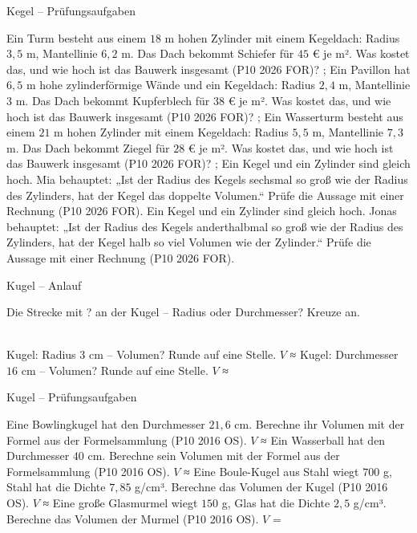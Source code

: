\begin{aufgabe}{Kegel – Prüfungsaufgaben}
\begin{teile}
\teil Ein Turm besteht aus einem $18$ m hohen Zylinder mit einem Kegeldach: Radius $3{,}5$ m, Mantellinie $6{,}2$ m. Das Dach bekommt Schiefer für $45$ € je m². Was kostet das, und wie hoch ist das Bauwerk insgesamt \hfill (P10 2026 FOR)? \leerfeld[€] ; \leerfeld[m]
\teil Ein Pavillon hat $6{,}5$ m hohe zylinderförmige Wände und ein Kegeldach: Radius $2{,}4$ m, Mantellinie $3$ m. Das Dach bekommt Kupferblech für $38$ € je m². Was kostet das, und wie hoch ist das Bauwerk insgesamt \hfill (P10 2026 FOR)? \leerfeld[€] ; \leerfeld[m]
\teil Ein Wasserturm besteht aus einem $21$ m hohen Zylinder mit einem Kegeldach: Radius $5{,}5$ m, Mantellinie $7{,}3$ m. Das Dach bekommt Ziegel für $28$ € je m². Was kostet das, und wie hoch ist das Bauwerk insgesamt \hfill (P10 2026 FOR)? \leerfeld[€] ; \leerfeld[m]
\teil Ein Kegel und ein Zylinder sind gleich hoch. Mia behauptet: „Ist der Radius des Kegels sechsmal so groß wie der Radius des Zylinders, hat der Kegel das doppelte Volumen.“ Prüfe die Aussage mit einer Rechnung \hfill (P10 2026 FOR).
\teil Ein Kegel und ein Zylinder sind gleich hoch. Jonas behauptet: „Ist der Radius des Kegels anderthalbmal so groß wie der Radius des Zylinders, hat der Kegel halb so viel Volumen wie der Zylinder.“ Prüfe die Aussage mit einer Rechnung \hfill (P10 2026 FOR).
\end{teile}
\end{aufgabe}

\begin{aufgabe}{Kugel – Anlauf}
\begin{teile}
\teil Die Strecke mit ? an der Kugel – Radius oder Durchmesser? Kreuze an.\\ \\ 

\teil Kugel: Radius $3$ cm – Volumen? Runde auf eine Stelle. $V$ ≈ \leerfeld[cm³]
\teil Kugel: Durchmesser $16$ cm – Volumen? Runde auf eine Stelle. $V$ ≈ \leerfeld[cm³]
\end{teile}
\end{aufgabe}

\begin{aufgabe}{Kugel – Prüfungsaufgaben}
\begin{teile}
\teil Eine Bowlingkugel hat den Durchmesser $21{,}6$ cm. Berechne ihr Volumen mit der Formel aus der Formelsammlung \hfill (P10 2016 OS). $V$ ≈ \leerfeld[cm³]
\teil Ein Wasserball hat den Durchmesser $40$ cm. Berechne sein Volumen mit der Formel aus der Formelsammlung \hfill (P10 2016 OS). $V$ ≈ \leerfeld[cm³]
\teil Eine Boule-Kugel aus Stahl wiegt $700$ g, Stahl hat die Dichte $7{,}85$ g/cm³. Berechne das Volumen der Kugel \hfill (P10 2016 OS). $V$ ≈ \leerfeld[cm³]
\teil Eine große Glasmurmel wiegt $150$ g, Glas hat die Dichte $2{,}5$ g/cm³. Berechne das Volumen der Murmel \hfill (P10 2016 OS). $V$ = \leerfeld[cm³]
\end{teile}
\end{aufgabe}
